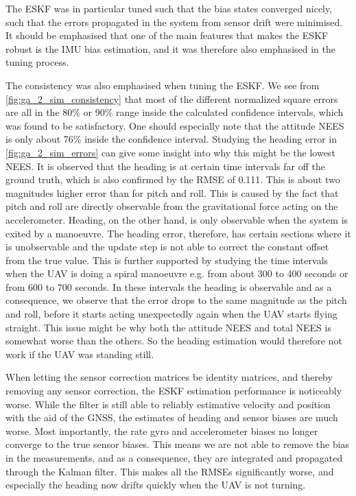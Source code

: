 The ESKF was in particular tuned such that the bias states converged nicely, such that the errors propagated in the system from sensor drift were minimised. It should be emphasised that one of the main features that makes the ESKF robust is the IMU bias estimation, and it was therefore also emphasised in the tuning process.

The consistency was also emphasised when tuning the ESKF. We see from \cref{fig:ga_2_sim_consistency} that most of the different normalized square errors are all in the 80\% or 90\% range inside the calculated confidence intervals, which was found to be satisfactory. One should especially note that the attitude NEES is only about 76\% inside the confidence interval. Studying the heading error in \cref{fig:ga_2_sim_errors} can give some insight into why this might be the lowest NEES. It is observed that the heading is at certain time intervals far off the ground truth, which is also confirmed by the RMSE of 0.111. This is about two magnitudes higher error than for pitch and roll. This is caused by the fact that pitch and roll are directly observable from the gravitational force acting on the accelerometer. Heading, on the other hand, is only observable when the system is exited by a manoeuvre. The heading error, therefore, has certain sections where it is unobservable and the update step is not able to correct the constant offset from the true value. This is further supported by studying the time intervals when the UAV is doing a spiral manoeuvre e.g. from about 300 to 400 seconds or from 600 to 700 seconds. In these intervals the heading is observable and as a consequence, we observe that the error drops to the same magnitude as the pitch and roll, before it starts acting unexpectedly again when the UAV starts flying straight. This issue might be why both the attitude NEES and total NEES is somewhat worse than the others. So the heading estimation would therefore not work if the UAV was standing still. 

When letting the sensor correction matrices be identity matrices, and thereby removing any sensor correction, the ESKF estimation performance is noticeably worse. While the filter is still able to reliably estimative velocity and position with the aid of the GNSS, the estimates of heading and sensor biases are much worse. Most importantly, the rate gyro and accelerometer biases no longer converge to the true sensor biases. This means we are not able to remove the bias in the measurements, and as a consequence, they are integrated and propagated through the Kalman filter. This makes all the RMSEs significantly worse, and especially the heading now drifts quickly when the UAV is not turning.

